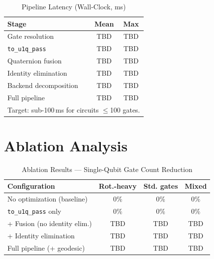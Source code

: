 \documentclass[conference]{IEEEtran}
\begin{document}
\begin{table}[htbp]
\caption{Pipeline Latency (Wall-Clock, ms)}
\begin{center}
\begin{tabular}{lcc}
\toprule
\textbf{Stage} & \textbf{Mean} & \textbf{Max} \\
\midrule
Gate resolution      & TBD & TBD \\
\texttt{to\_u1q\_pass}        & TBD & TBD \\
Quaternion fusion    & TBD & TBD \\
Identity elimination & TBD & TBD \\
Backend decomposition & TBD & TBD \\
Full pipeline        & TBD & TBD \\
\bottomrule
\multicolumn{3}{l}{\footnotesize Target: sub-100\,ms for circuits $\leq$100 gates.}
\end{tabular}
\label{tab:latency}
\end{center}
\end{table}

\section{Ablation Analysis}

\begin{table}[htbp]
\caption{Ablation Results --- Single-Qubit Gate Count Reduction}
\begin{center}
\begin{tabular}{p{3.4cm}ccc}
\toprule
\textbf{Configuration} & \textbf{Rot.-heavy} & \textbf{Std. gates} & \textbf{Mixed} \\
\midrule
No optimization (baseline)               & 0\%  & 0\%  & 0\%  \\
\texttt{to\_u1q\_pass} only              & 0\%  & 0\%  & 0\%  \\
+ Fusion (no identity elim.)             & TBD  & TBD  & TBD  \\
+ Identity elimination                   & TBD  & TBD  & TBD  \\
Full pipeline (+ geodesic)               & TBD  & TBD  & TBD  \\
\bottomrule
\end{tabular}
\label{tab:ablation}
\end{center}
\end{table}
\end{document}
